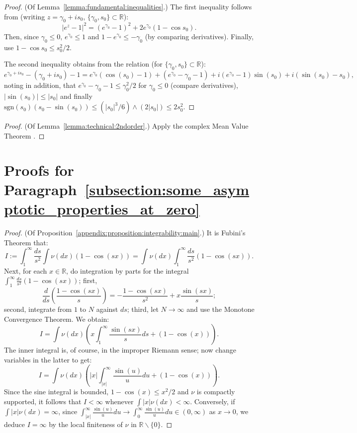 \documentclass[pdftex,oneside,11pt,reqno]{amsart}
\theoremstyle{definition}
\theoremstyle{theorem}
\theoremstyle{remark}
\numberwithin{equation}{section}
\numberwithin{definition}{section}
\begin{document}
\begin{proof}(Of Lemma~\ref{lemma:fundamental:inequalities}.)
The first inequality follows from (writing $z=\gamma_0+is_0$, $\{\gamma_0,s_0\}\subset \mathbb{R}$): $$\vert e^{z}-1\vert^2=(e^{\gamma_0}-1)^2+2e^{\gamma_0}(1-\cos s_0).$$ Then, since $\gamma_0\leq 0$, $e^{\gamma_0}\leq 1$ and $1-e^{\gamma_0}\leq -\gamma_0$ (by comparing derivatives). Finally, use $1-\cos s_0\leq s_0^2/2$.

The second inequality obtains from the relation (for $\{\gamma_0,s_0\}\subset \mathbb{R}$): $$e^{\gamma_0+is_0}-(\gamma_0+is_0)-1=e^{\gamma_0}(\cos(s_0)-1)+(e^{\gamma_0}-\gamma_0-1)+i(e^{\gamma_0}-1)\sin(s_0)+i(\sin(s_0)-s_0),$$ noting in addition, that $e^{\gamma_0}-\gamma_0-1\leq \gamma_0^2/2$ for $\gamma_0\leq 0$ (compare derivatives), $\vert \sin(s_0)\vert\leq \vert s_0\vert$ and finally $\mathrm{sgn}(s_0)(s_0-\sin(s_0))\leq (\vert s_0\vert^3/6)\land (2\vert s_0\vert)\leq 2s_0^2$.
\end{proof}

\begin{proof}(Of Lemma~\ref{lemma:technical:2ndorder}.)
Apply the complex Mean Value Theorem \cite[p. 859, Theorem 2.2]{evard}.
\end{proof}

\section{Proofs for Paragraph~\ref{subsection:some_asymptotic_properties_at_zero}}\label{appendix:some_asymptotic_properties_of_measures_on_R}

\begin{proof}(Of Proposition~\ref{appendix:proposition:integrability:main}.)
It is Fubini's Theorem that: $$I:=\int_1^\infty \frac{ds}{s^2}\int \nu(dx)(1-\cos(sx))=\int \nu(dx)\int_1^\infty \frac{ds}{s^2}(1-\cos(sx)).$$ Next, for each $x\in \mathbb{R}$, do integration by parts for the integral $\int_1^\infty \frac{ds}{s^2}(1-\cos(sx))$; first, $$\frac{d}{ds}\left(\frac{1- \cos(sx)}{s}\right)=-\frac{1-\cos(sx)}{s^2}+x\frac{\sin(sx)}{s};$$ second, integrate from $1$ to $N$ against $ds$; third, let $N\to\infty$ and use the Monotone Convergence Theorem. We obtain: $$I=\int\nu(dx)\left(x\int_1^\infty\frac{\sin(sx)}{s}ds+(1-\cos(x))\right).$$ The inner integral is, of course, in the improper Riemann sense; now change variables in the latter to get: $$I=\int\nu(dx)\left(\vert x\vert\int_{\vert x\vert}^\infty\frac{\sin(u)}{u}du+(1-\cos(x))\right).$$ Since the sine integral is bounded, $1-\cos(x)\leq x^2/2$ and $\nu$ is compactly supported, it follows that $I<\infty$ whenever $\int\vert x\vert \nu(dx)<\infty$. Conversely, if $\int \vert x\vert \nu(dx)=\infty$, since $\int_{\vert x\vert}^\infty\frac{\sin(u)}{u}du\to \int_0^\infty \frac{\sin(u)}{u}du\in (0,\infty)$ as $x\to 0$, we deduce $I=\infty$ by the local finiteness of $\nu$ in $\mathbb{R}\backslash \{0\}$. 
\end{proof}
\end{document}
